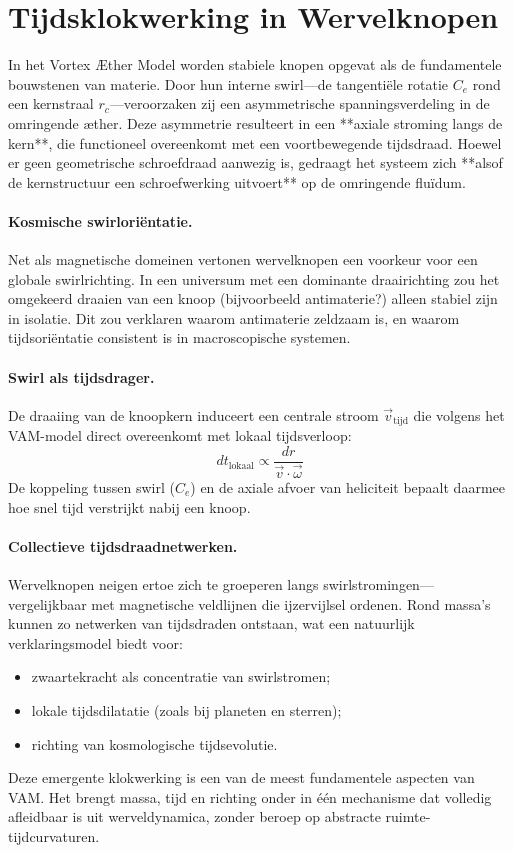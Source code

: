 \section{Tijdsklokwerking in Wervelknopen}

In het Vortex \AE ther Model worden stabiele knopen opgevat als de fundamentele bouwstenen van materie. Door hun interne swirl—de tangentiële rotatie \( C_e \) rond een kernstraal \( r_c \)—veroorzaken zij een asymmetrische spanningsverdeling in de omringende \ae ther. Deze asymmetrie resulteert in een **axiale stroming langs de kern**, die functioneel overeenkomt met een voortbewegende tijdsdraad. Hoewel er geen geometrische schroefdraad aanwezig is, gedraagt het systeem zich **alsof de kernstructuur een schroefwerking uitvoert** op de omringende fluïdum.

\paragraph{Kosmische swirloriëntatie.}
Net als magnetische domeinen vertonen wervelknopen een voorkeur voor een globale swirlrichting. In een universum met een dominante draairichting zou het omgekeerd draaien van een knoop (bijvoorbeeld antimaterie?) alleen stabiel zijn in isolatie. Dit zou verklaren waarom antimaterie zeldzaam is, en waarom tijdsoriëntatie consistent is in macroscopische systemen.

\paragraph{Swirl als tijdsdrager.}
De draaiing van de knoopkern induceert een centrale stroom \( \vec{v}_\text{tijd} \) die volgens het VAM-model direct overeenkomt met lokaal tijdsverloop:
\[
    dt_{\text{lokaal}} \propto \frac{dr}{\vec{v} \cdot \vec{\omega}}
\]
De koppeling tussen swirl (\( C_e \)) en de axiale afvoer van heliciteit bepaalt daarmee hoe snel tijd verstrijkt nabij een knoop.

\paragraph{Collectieve tijdsdraadnetwerken.}
Wervelknopen neigen ertoe zich te groeperen langs swirlstromingen—vergelijkbaar met magnetische veldlijnen die ijzervijlsel ordenen. Rond massa’s kunnen zo netwerken van tijdsdraden ontstaan, wat een natuurlijk verklaringsmodel biedt voor:
\begin{itemize}
    \item zwaartekracht als concentratie van swirlstromen;
    \item lokale tijdsdilatatie (zoals bij planeten en sterren);
    \item richting van kosmologische tijdsevolutie.
\end{itemize}

Deze emergente klokwerking is een van de meest fundamentele aspecten van VAM. Het brengt massa, tijd en richting onder in één mechanisme dat volledig afleidbaar is uit werveldynamica, zonder beroep op abstracte ruimte-tijdcurvaturen.